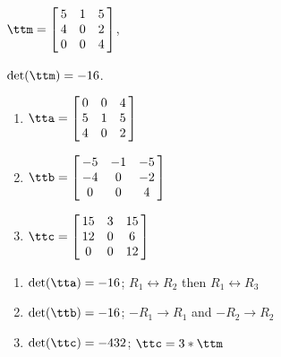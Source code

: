 {$\ttm=\left[\hskip -3pt \begin{array}{ccc} 5&1&5\\  4&0&2
\\  0&0&4\end{array}\hskip -3pt \right] $,

 $\det(\ttm)=-16$.
\begin{enumerate}
\item $\tta = \left[\hskip -3pt \begin{array}{ccc} 0&0&4\\  5&1&5
\\  4&0&2\end{array}\hskip -3pt \right] $
\item	$\ttb = \left[\hskip -3pt \begin{array}{ccc} -5&-1&-5\\  -4&0&-2
\\  0&0&4\end{array}\hskip -3pt \right]$
\item	$\ttc = \left[\hskip -3pt \begin{array}{ccc} 15&3&15\\  12&0&6
\\  0&0&12\end{array}\hskip -3pt \right]$
\end{enumerate}} 
{\begin{enumerate}
\item $\det(\tta) = -16$; $R_1\leftrightarrow R_2$ then $R_1\leftrightarrow R_3$
\item $\det(\ttb) = -16$; $-R_1\rightarrow R_1$ and $-R_2\rightarrow R_2$
\item $\det(\ttc) = -432$; $\ttc = 3*\ttm$
\end{enumerate}}



  

